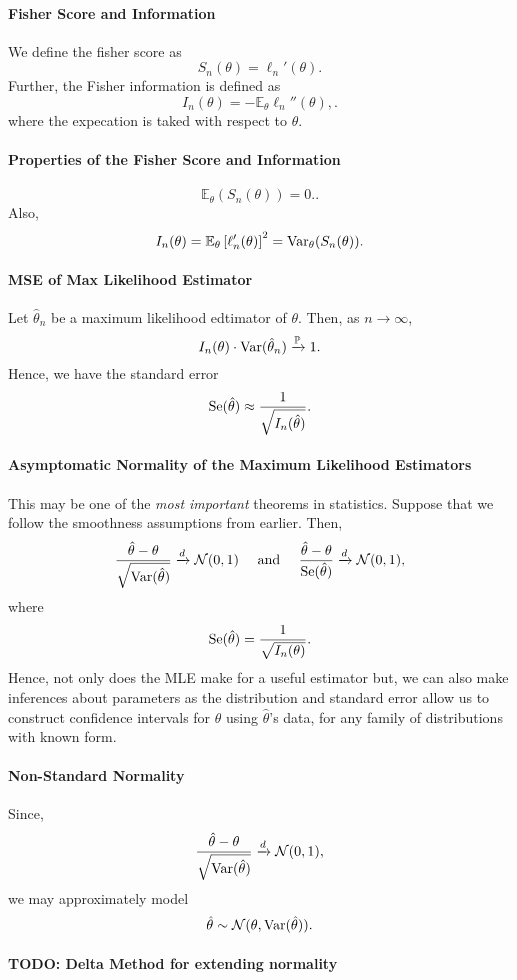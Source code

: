 \paragraph{Fisher Score and Information}
We define the fisher score as \[
  S_n(\theta) = \ell_n'(\theta)
.\]
Further, the Fisher information is defined as \[
  I_n(\theta) = - \mathbb{E}_\theta \ell_n'' (\theta),
.\] where the expecation is taked with respect to \(\theta\).

\paragraph{Properties of the Fisher Score and Information} \[
  \mathbb{E}_\theta \left( S_n(\theta) \right)  = 0.
.\] Also, \[
I_n(\theta) = \mathbb{E}_\theta \left[ \ell_n'(\theta) \right]^2 = \mathrm{Var}_\theta(S_n(\theta))
.\] 

\paragraph{MSE of Max Likelihood Estimator} Let \(\hat{\theta}_n\) be a maximum likelihood edtimator of
\(\theta\). Then, as \(n \to \infty\), \[
  I_n(\theta) \cdot \mathrm{Var}(\hat{\theta}_n) \xrightarrow{\mathbb{P}} 1
.\] 
Hence, we have the standard error \[
  \mathrm{Se}(\hat{\theta}) \approx \frac{1}{\sqrt{I_n (\hat{\theta})} }
.\] 

\paragraph{Asymptomatic Normality of the Maximum Likelihood Estimators}
This may be one of the \textit{most important} theorems in statistics. Suppose that
we follow the smoothness assumptions from earlier. Then, \[
  \frac{\hat{\theta} - \theta}{\sqrt{\mathrm{Var}(\hat{\theta})}} \xrightarrow{d} \mathcal{N}(0, 1)
  \quad \text{ and } \quad
  \frac{\hat{\theta} - \theta}{\mathrm{Se}(\hat{\theta})} \xrightarrow{d} \mathcal{N}(0, 1),
\] where \[
  \mathrm{Se}(\hat{\theta}) = \frac{1}{\sqrt{I_n(\theta)}}
.\] 
Hence, not only does the MLE make for a useful estimator but, we can also
make inferences about parameters as the distribution and standard error allow us to construct
confidence intervals for \(\theta\) using \(\hat{\theta}\)'s data, for any family
of distributions with known form.

\paragraph{Non-Standard Normality}
Since, \[
  \frac{\hat{\theta} - \theta}{\sqrt{\mathrm{Var}(\hat{\theta})}} \xrightarrow{d} \mathcal{N}(0, 1)
,\] we may approximately model \[
  \hat{\theta} \sim \mathcal{N}(\theta, \mathrm{Var}(\hat{\theta}))
.\] 

\paragraph{TODO: Delta Method for extending normality}



